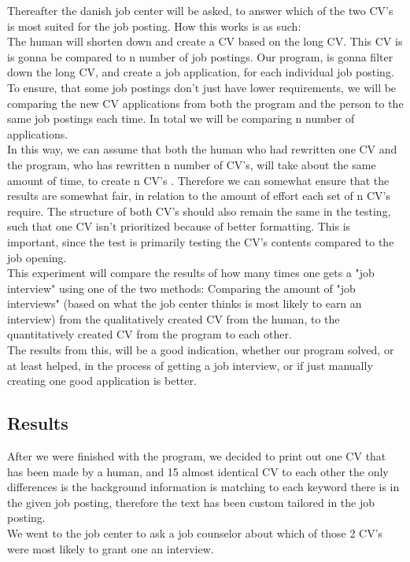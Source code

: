 Thereafter the danish job center will be asked, to answer which of the two CV's is most suited
for the job posting. How this works is as such:
\\
The human will shorten down and create a CV based on the long CV. This CV is
is gonna be compared to n number of job postings.
Our program, is gonna filter down the long CV, and create a job application,
for each individual job posting. 
To ensure, that some job postings don't just have lower requirements, we will be
comparing the new CV applications from both the program and the person to the same 
job postings each time. In total we will be comparing n number of applications.
\\
In this way, we can assume that both the human who had rewritten one
CV and the program, who has rewritten n number of CV's,
will take about the same amount of time, to create n CV's .
Therefore we can somewhat ensure that the results are somewhat fair, in relation to the amount of effort each set of n CV's require.
The structure of both CV's should also remain the same in the testing, such that one CV isn't prioritized because of better formatting.
This is important, since the test is primarily testing the CV's contents compared to the job opening.
\\
This experiment will compare the results of how many times one gets a "job
interview" using one of the two methods: Comparing the amount of 
"job interviews" (based on what the job center thinks is most likely to earn an interview) 
from the qualitatively created CV from
the human, to the quantitatively created CV from the program to
each other.
\\
The results from this, will be a good indication, whether our program solved, or
at least helped, in the process of getting a job interview, or if just manually
creating one good application is better.

\subsection{Results}
After we were finished with the program, we decided to print out one CV that has been made by a human,
and 15 almost identical CV to each other the only differences is 
the background information is matching to each keyword there is in the given job posting, 
therefore the text has been custom tailored in the job posting. \\

We went to the job center to ask a job counselor about which of those 2 CV's were most likely to grant one an interview.

